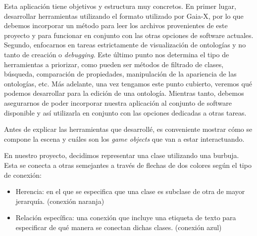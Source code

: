 Esta aplicación tiene objetivos y estructura muy concretos. En primer lugar, desarrollar herramientas utilizando el formato utilizado por Gaia-X, por lo que debemos incorporar un método para leer los archivos provenientes de este proyecto y para funcionar en conjunto con las otras opciones de software actuales.
Segundo, enfocarnos en tareas estrictamente de visualización de ontologías y no tanto de creación o \textit{debugging}. Este último punto nos determina el tipo de herramientas a priorizar, como pueden ser métodos de filtrado de clases,
búsqueda, comparación de propiedades, manipulación de la apariencia de las ontologías, etc. Más adelante, una vez tengamos este punto cubierto, veremos qué podemos desarrollar para la edición de una ontología. Mientras tanto, debemos
asegurarnos de poder incorporar nuestra aplicación al conjunto de software disponible y así utilizarla en conjunto con las opciones dedicadas a otras tareas.

Antes de explicar las herramientas que desarrollé, es conveniente mostrar cómo se compone la escena y cuáles son los \textit{game objects} que van a estar interactuando.

En nuestro proyecto, decidimos representar una clase utilizando una burbuja. Esta se conecta a otras semejantes a través de flechas de dos colores según el tipo de conexión:

\begin{itemize}
   \item Herencia: en el que se especifica que una clase es subclase de otra de mayor jerarquía. (conexión naranja)
   \item Relación específica: una conexión que incluye una etiqueta de texto para especificar de qué manera se conectan dichas clases. (conexión azul) 
\end{itemize}

